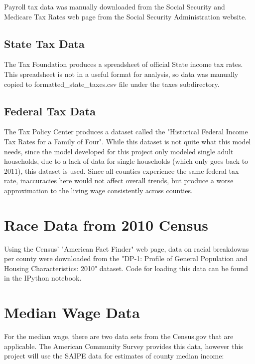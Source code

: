 Payroll tax data was manually downloaded from the Social Security and Medicare Tax Rates web page from the Social Security Administration website. \cite{ssa} 

\subsection{State Tax Data}

The Tax Foundation produces a spreadsheet of official State income tax rates. This spreadsheet is not in a useful format for analysis, so data was manually copied to formatted\_state\_taxes.csv file under the taxes subdirectory. \cite{state_tax}

\subsection{Federal Tax Data}

The Tax Policy Center produces a dataset called the "Historical Federal Income Tax Rates for a Family of Four". While this dataset is not quite what this model needs, since the model developed for this project only modeled single adult households, due to a lack of data for single households (which only goes back to 2011), this dataset is used. \cite{federal_tax} Since all counties experience the same federal tax rate, inaccuracies here would not affect overall trends, but produce a worse approximation to the living wage consistently across counties.

\section{Race Data from 2010 Census}

Using the Census' "American Fact Finder" web page, data on racial breakdowns per county were downloaded from the "DP-1: Profile of General Population and Housing Characteristics: 2010" dataset. \cite{race_data} Code for loading this data can be found in the IPython notebook. \cite{code_data_race}


\section{Median Wage Data}

For the median wage, there are two data sets from the Census.gov that are applicable. The American Community Survey provides this data, however this project will use the SAIPE data for estimates of county median income:

